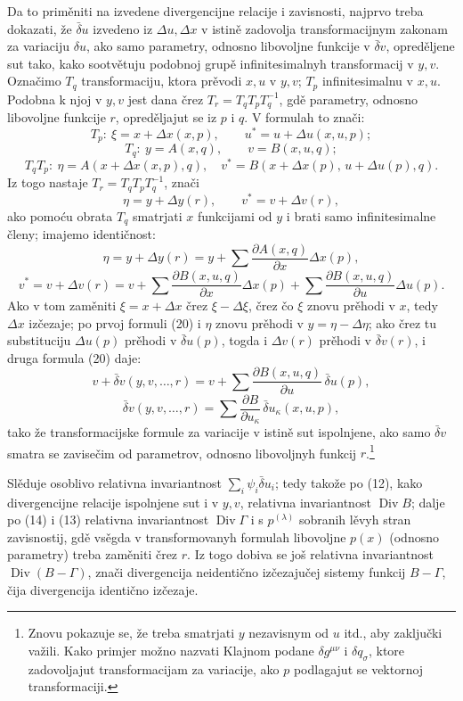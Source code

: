 \documentclass[11pt]{article}
\providecommand{\D}{\Delta}
\providecommand{\p}{\partial}
\DeclareMathOperator{\Div}{Div}
\providecommand{\bd}{\bar{\delta}}
\begin{document}
Da to priměniti na izvedene divergencijne relacije i zavisnosti, najprvo treba dokazati, že \(\bd u\) izvedeno iz \(\D u,\D x\) v istině zadovolja transformacijnym zakonam za variaciju \(\delta u\), ako samo parametry, odnosno libovoljne funkcije v \(\bd v\), opreděljene sut tako, kako sootvětuju podobnoj grupě infinitesimalnyh transformacij v \(y,v\). Označimo \(T_q\) transformaciju, ktora prěvodi \(x,u\) v \(y,v\); \(T_p\) infinitesimalnu v \(x,u\). Podobna k njoj v \(y,v\) jest dana črez \(T_r=T_qT_pT_q^{-1}\), gdě parametry, odnosno libovoljne funkcije \(r\), opreděljajut se iz \(p\) i \(q\). V formulah to znači:
\[
T_p:\ \xi=x+\D x(x,p),\qquad u^*=u+\D u(x,u,p);
\]
\[
T_q:\ y=A(x,q),\qquad v=B(x,u,q);
\]
\[
T_qT_p:\ \eta=A(x+\D x(x,p),q),\quad
v^*=B(x+\D x(p),\,u+\D u(p),q).
\]
Iz togo nastaje \(T_r=T_qT_pT_q^{-1}\), znači
\[
\eta=y+\D y(r),\qquad v^*=v+\D v(r),
\]
ako pomoću obrata \(T_q\) smatrjati \(x\) funkcijami od \(y\) i brati samo infinitesimalne členy; imajemo identičnost:
\begin{equation}
\eta=y+\D y(r)=y+\sum\frac{\p A(x,q)}{\p x}\D x(p),
\tag{20a}
\end{equation}
\begin{equation}
v^*=v+\D v(r)=v+\sum\frac{\p B(x,u,q)}{\p x}\D x(p)
+\sum\frac{\p B(x,u,q)}{\p u}\D u(p).
\tag{20b}
\end{equation}
Ako v tom zaměniti \(\xi=x+\D x\) črez \(\xi-\D \xi\), črez čo \(\xi\) znovu prěhodi v \(x\), tedy \(\D x\) izčezaje; po prvoj formuli (20) i \(\eta\) znovu prěhodi v \(y=\eta-\D\eta\); ako črez tu substituciju \(\D u(p)\) prěhodi v \(\bd u(p)\), togda i \(\D v(r)\) prěhodi v \(\bd v(r)\), i druga formula (20) daje:
\[
v+\bd v(y,v,\ldots,r)=v+\sum\frac{\p B(x,u,q)}{\p u}\,\bd u(p),
\]
\[
\bd v(y,v,\ldots,r)=\sum\frac{\p B}{\p u_\kappa}\,\bd u_\kappa(x,u,p),
\]
tako že transformacijske formule za variacije v istině sut ispolnjene, ako samo \(\bd v\) smatra se zavisečim od parametrov, odnosno libovoljnyh funkcij \(r\).\footnote{Znovu pokazuje se, že treba smatrjati \(y\) nezavisnym od \(u\) itd., aby zaključki važili. Kako primjer možno nazvati Klajnom podane \(\delta g^{\mu\nu}\) i \(\delta q_\sigma\), ktore zadovoljajut transformacijam za variacije, ako \(p\) podlagajut se vektornoj transformaciji.}

Slěduje osoblivo relativna invariantnost \(\sum_i\psi_i\bd u_i\); tedy takože po (12), kako divergencijne relacije ispolnjene sut i v \(y,v\), relativna invariantnost \(\Div B\); dalje po (14) i (13) relativna invariantnost \(\Div\Gamma\) i s \(p^{(\lambda)}\) sobranih lěvyh stran zavisnostij, gdě vsěgda v transformovanyh formulah libovoljne \(p(x)\) (odnosno parametry) treba zaměniti črez \(r\). Iz togo dobiva se još relativna invariantnost \(\Div(B-\Gamma)\), znači divergencija neidentično izčezajučej sistemy funkcij \(B-\Gamma\), čija divergencija identično izčezaje.
\end{document}
